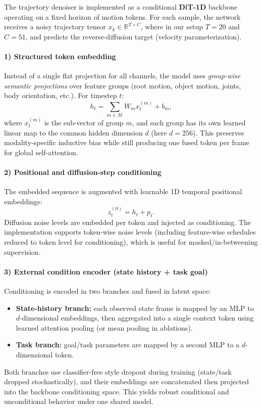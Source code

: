The trajectory denoiser is implemented as a conditional \textbf{DiT-1D} backbone operating on a fixed horizon of motion tokens. For each sample, the network receives a noisy trajectory tensor
\(x_k \in \mathbb{R}^{T\times C}\), where in our setup \(T=20\) and \(C=51\), and predicts the reverse-diffusion target (velocity parameterization).

\paragraph{1) Structured token embedding}
Instead of a single flat projection for all channels, the model uses \emph{group-wise semantic projections} over feature groups (root motion, object motion, joints, body orientation, etc.). For timestep \(t\):
\[
h_t=\sum_{m\in\mathcal{M}} W_m x_t^{(m)} + b_m,
\]
where \(x_t^{(m)}\) is the sub-vector of group \(m\), and each group has its own learned linear map to the common hidden dimension \(d\) (here \(d=256\)). This preserves modality-specific inductive bias while still producing one fused token per frame for global self-attention.

\paragraph{2) Positional and diffusion-step conditioning}
The embedded sequence is augmented with learnable 1D temporal positional embeddings:
\[
z_t^{(0)} = h_t + p_t.
\]
Diffusion noise levels are embedded per token and injected as conditioning. The implementation supports token-wise noise levels (including feature-wise schedules reduced to token level for conditioning), which is useful for masked/in-betweening supervision.

\paragraph{3) External condition encoder (state history + task goal)}
Conditioning is encoded in two branches and fused in latent space:
\begin{itemize}
    \item \textbf{State-history branch:} each observed state frame is mapped by an MLP to \(d\)-dimensional embeddings, then aggregated into a single context token using learned attention pooling (or mean pooling in ablations).
    \item \textbf{Task branch:} goal/task parameters are mapped by a second MLP to a \(d\)-dimensional token.
\end{itemize}
Both branches use classifier-free style dropout during training (state/task dropped stochastically), and their embeddings are concatenated then projected into the backbone conditioning space. This yields robust conditional and unconditional behavior under one shared model.

